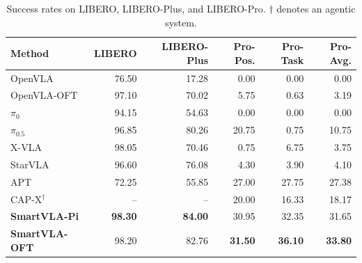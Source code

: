 \begin{table}[!htb]
\centering
\setlength{\abovecaptionskip}{0pt}
\setlength{\belowcaptionskip}{\baselineskip}
\caption{Success rates on LIBERO, LIBERO-Plus, and LIBERO-Pro. $\dagger$ denotes an agentic system.}
\label{tab:libero-overview}
\label{tab:libero-pro}
\normalsize
\setlength{\tabcolsep}{3.2pt}
\begin{tabular}{@{}lrrrrr@{}}
\toprule
Method & LIBERO & LIBERO-Plus & Pro-Pos. & Pro-Task & Pro-Avg. \\
\midrule
OpenVLA & 76.50 & 17.28 & 0.00 & 0.00 & 0.00 \\
OpenVLA-OFT & 97.10 & 70.02 & 5.75 & 0.63 & 3.19 \\
$\pi_{0}$ & 94.15 & 54.63 & 0.00 & 0.00 & 0.00 \\
$\pi_{0.5}$ & 96.85 & 80.26 & 20.75 & 0.75 & 10.75 \\
X-VLA & 98.05 & 70.46 & 0.75 & 6.75 & 3.75 \\
StarVLA & 96.60 & 76.08 & 4.30 & 3.90 & 4.10 \\
APT & 72.25 & 55.85 & 27.00 & 27.75 & 27.38 \\
CAP-X$^\dagger$ & -- & -- & 20.00 & 16.33 & 18.17 \\
\midrule
\rowcolor{smartvlarow}
\textbf{SmartVLA-Pi} & \textbf{98.30} & \textbf{84.00} & 30.95 & 32.35 & 31.65 \\
\rowcolor{smartvlarow}
\textbf{SmartVLA-OFT} & 98.20 & 82.76 & \textbf{31.50} & \textbf{36.10} & \textbf{33.80} \\
\bottomrule
\end{tabular}
\end{table}
